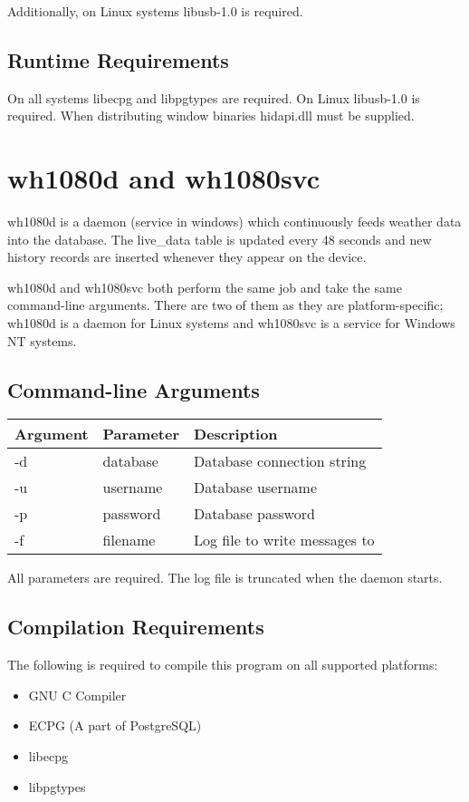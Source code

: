 \documentclass[a4paper,10pt,draft]{book}
\begin{document}
Additionally, on Linux systems libusb-1.0 is required.

\section{Runtime Requirements}
On all systems libecpg and libpgtypes are required. On Linux libusb-1.0 is required. When distributing window binaries hidapi.dll must be supplied.

\chapter{wh1080d and wh1080svc}
wh1080d is a daemon (service in windows) which continuously feeds weather data into the database. The live\_data table is updated every 48 seconds and new history records are inserted whenever they appear on the device.

wh1080d and wh1080svc both perform the same job and take the same command-line arguments. There are two of them as they are platform-specific; wh1080d is a daemon for Linux systems and wh1080svc is a service for Windows NT systems. 


\section{Command-line Arguments}
\begin{tabular}{l l p{10cm}}
\hline
\textbf{Argument} & \textbf{Parameter} & \textbf{Description} \\
\hline
-d & database & Database connection string \\
-u & username & Database username \\
-p & password & Database password \\
-f & filename & Log file to write messages to \\
\hline
\end{tabular}

All parameters are required. The log file is truncated when the daemon starts.

\section{Compilation Requirements}
The following is required to compile this program on all supported platforms:
\begin{itemize}
\item GNU C Compiler
\item ECPG (A part of PostgreSQL)
\item libecpg
\item libpgtypes
\end{itemize}
\end{document}
